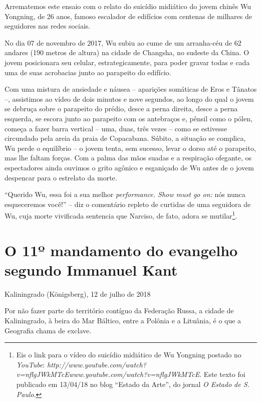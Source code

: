 Arrematemos este ensaio com o relato do suicídio midiático do jovem
chinês Wu Yongning, de 26 anos, famoso escalador de edifícios com
centenas de milhares de seguidores nas redes sociais.

No dia 07 de novembro de 2017, Wu subiu ao cume de um arranha-céu de 62
andares (190 metros de altura) na cidade de Changsha, no sudeste da
China. O jovem posicionara seu celular, estrategicamente, para poder
gravar todas e cada uma de suas acrobacias junto ao parapeito do
edifício.

Com uma mistura de ansiedade e náusea -- aparições somáticas de Eros e
Tânatos --, assistimos ao vídeo de dois minutos e nove segundos, ao
longo do qual o jovem se debruça sobre o parapeito do prédio, desce a
perna direita, desce a perna esquerda, se escora junto ao parapeito com
os antebraços e, pênsil como o pólen, começa a fazer barra vertical --
uma, duas, três vezes -- como se estivesse circundado pela areia da
praia de Copacabana. Súbito, a situação se complica, Wu perde o
equilíbrio -- o jovem tenta, sem sucesso, levar o dorso até o parapeito,
mas lhe faltam forças. Com a palma das mãos suadas e a respiração
ofegante, os espectadores ainda ouvimos o grito agônico e esganiçado de
Wu antes de o jovem despencar para o estrelato da morte.

``Querido Wu, essa foi a sua melhor \emph{performance. Show must go on:}
nós nunca esqueceremos você!'' -- diz o comentário repleto de curtidas
de uma seguidora de Wu, cuja morte vivificada sentencia que Narciso, de
fato, adora se mutilar\footnote{Eis o link para o vídeo do suicídio
  midiático de Wu Yongning postado no \emph{YouTube}:
  \emph{http://www.youtube.com/watch?v=nflgJWkMTcE}{\emph{www.youtube.com/watch?v=nflgJWkMTcE}}.
  Este texto foi publicado em 13/04/18 no blog ``Estado da Arte'', do
  jornal \emph{O Estado de S. Paulo}.}.

\chapter*{O 11º mandamento do evangelho segundo Immanuel Kant}

\begin{flushright}
Kaliningrado (Königsberg), 12 de julho de 2018
\end{flushright}

Por não fazer parte do território contíguo da Federação Russa, a cidade
de Kaliningrado, à beira do Mar Báltico, entre a Polônia e a Lituânia, é
o que a Geografia chama de exclave.


